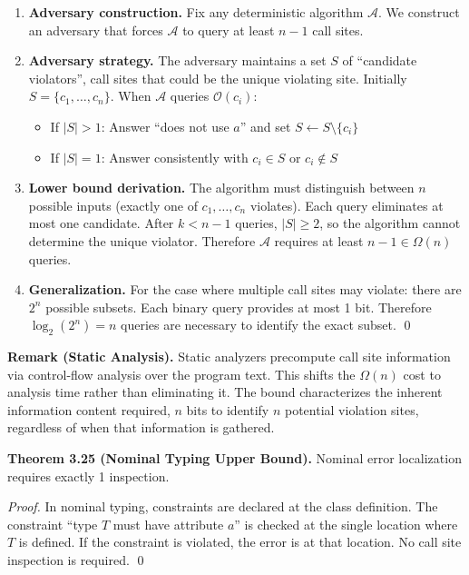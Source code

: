 \begin{enumerate}
\def\labelenumi{\arabic{enumi}.}
\item
  \textbf{Adversary construction.} Fix any deterministic algorithm
  \(\mathcal{A}\). We construct an adversary that forces \(\mathcal{A}\)
  to query at least \(n-1\) call sites.
\item
  \textbf{Adversary strategy.} The adversary maintains a set \(S\) of
  ``candidate violators'', call sites that could be the unique
  violating site. Initially \(S = \{c_1, \ldots, c_n\}\). When
  \(\mathcal{A}\) queries \(\mathcal{O}(c_i)\):

  \begin{itemize}
  \tightlist
  \item
    If \(|S| > 1\): Answer ``does not use \(a\)'' and set
    \(S \leftarrow S \setminus \{c_i\}\)
  \item
    If \(|S| = 1\): Answer consistently with \(c_i \in S\) or
    \(c_i \notin S\)
  \end{itemize}
\item
  \textbf{Lower bound derivation.} The algorithm must distinguish
  between \(n\) possible inputs (exactly one of \(c_1, \ldots, c_n\)
  violates). Each query eliminates at most one candidate. After
  \(k < n-1\) queries, \(|S| \geq 2\), so the algorithm cannot determine
  the unique violator. Therefore \(\mathcal{A}\) requires at least
  \(n-1 \in \Omega(n)\) queries.
\item
  \textbf{Generalization.} For the case where multiple call sites may
  violate: there are \(2^n\) possible subsets. Each binary query
  provides at most 1 bit. Therefore \(\log_2(2^n) = n\) queries are
  necessary to identify the exact subset. \qed
\end{enumerate}

\textbf{Remark (Static Analysis).} Static analyzers precompute call site
information via control-flow analysis over the program text. This shifts
the \(\Omega(n)\) cost to analysis time rather than eliminating it. The
bound characterizes the inherent information content required, \(n\)
bits to identify \(n\) potential violation sites, regardless of when
that information is gathered.

\textbf{Theorem 3.25 (Nominal Typing Upper Bound).} Nominal error
localization requires exactly 1 inspection.

\emph{Proof.} In nominal typing, constraints are declared at the class
definition. The constraint ``type \(T\) must have attribute \(a\)'' is
checked at the single location where \(T\) is defined. If the constraint
is violated, the error is at that location. No call site inspection is
required. \qed

